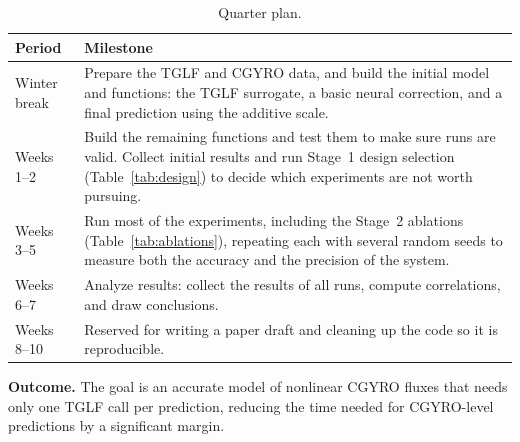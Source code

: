\documentclass[10pt,letterpaper]{article}
\newcommand{\tablestyle}{\small\renewcommand{\arraystretch}{1.15}\setlength{\parskip}{0pt}}
\begin{document}
\begin{table}[H]
      \tablestyle
      \caption{Quarter plan.}
      \label{tab:plan}
      \begin{tabular}{@{}L{0.95in}L{5.78in}@{}}
            \toprule
            \textbf{Period} & \textbf{Milestone} \\
            \midrule
            Winter break & Prepare the TGLF and CGYRO data, and build the initial model and functions: the TGLF surrogate, a basic neural correction, and a final prediction using the additive scale. \\[3pt]
            Weeks 1--2 & Build the remaining functions and test them to make sure runs are valid. Collect initial results and run Stage~1 design selection (Table~\ref{tab:design}) to decide which experiments are not worth pursuing. \\[3pt]
            Weeks 3--5 & Run most of the experiments, including the Stage~2 ablations (Table~\ref{tab:ablations}), repeating each with several random seeds to measure both the accuracy and the precision of the system. \\[3pt]
            Weeks 6--7 & Analyze results: collect the results of all runs, compute correlations, and draw conclusions. \\[3pt]
            Weeks 8--10 & Reserved for writing a paper draft and cleaning up the code so it is reproducible. \\
            \bottomrule
      \end{tabular}
\end{table}

\textbf{Outcome.} The goal is an accurate model of nonlinear CGYRO fluxes that needs only one TGLF call per prediction, reducing the time needed for CGYRO-level predictions by a significant margin.
\end{document}
